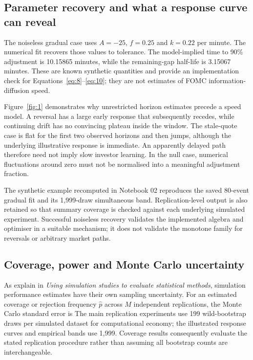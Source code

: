 
\subsection{Parameter recovery and what a response curve can reveal}
The noiseless gradual case uses $A=-25$, $f=0.25$ and $k=0.22$ per minute. The numerical fit recovers those values to tolerance. The model-implied time to 90\% adjustment is 10.15865 minutes, while the remaining-gap half-life is 3.15067 minutes. These are known synthetic quantities and provide an implementation check for Equations~\ref{eq:8}--\ref{eq:10}; they are not estimates of FOMC information-diffusion speed.

Figure~\ref{fig:1} demonstrates why unrestricted horizon estimates precede a speed model. A reversal has a large early response that subsequently recedes, while continuing drift has no convincing plateau inside the window. The stale-quote case is flat for the first two observed horizons and then jumps, although the underlying illustrative response is immediate. An apparently delayed path therefore need not imply slow investor learning. In the null case, numerical fluctuations around zero must not be normalised into a meaningful adjustment fraction.

The synthetic example recomputed in Notebook 02 reproduces the saved 80-event gradual fit and its 1,999-draw simultaneous band. Replication-level output is also retained so that summary coverage is checked against each underlying simulated experiment. Successful noiseless recovery validates the implemented algebra and optimiser in a suitable mechanism; it does not validate the monotone family for reversals or arbitrary market paths.

\subsection{Coverage, power and Monte Carlo uncertainty}
As  explain in \textit{Using simulation studies to evaluate statistical methods}, simulation performance estimates have their own sampling uncertainty. For an estimated coverage or rejection frequency $\hat p$ across $M$ independent replications, the Monte Carlo standard error is
The main replication experiments use 199 wild-bootstrap draws per simulated dataset for computational economy; the illustrated response curves and empirical bands use 1,999. Coverage results consequently evaluate the stated replication procedure rather than assuming all bootstrap counts are interchangeable.

